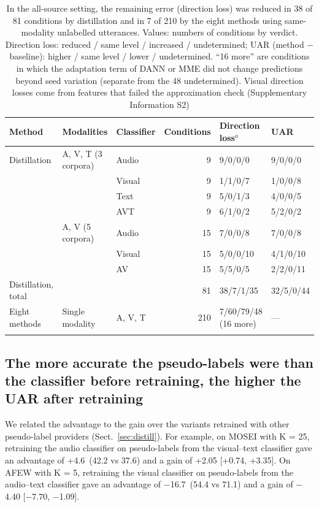 \begin{table}[!htbp]
\caption{In the all-source setting, the remaining error (direction loss) was reduced in 38 of 81 conditions by distillation and in 7 of 210 by the eight methods using same-modality unlabelled utterances. Values: numbers of conditions by verdict. Direction loss: reduced / same level / increased / undetermined; UAR (method $-$ baseline): higher / same level / lower / undetermined. ``16 more'' are conditions in which the adaptation term of DANN or MME did not change predictions beyond seed variation (separate from the 48 undetermined). Visual direction losses come from features that failed the approximation check (Supplementary Information S2)}\label{tab:remaining}
\footnotesize
\begin{tabular}{@{}lllrll@{}}
\toprule
Method & Modalities & Classifier & Conditions & Direction loss$^{a}$ & UAR \\
\midrule
Distillation & A, V, T (3 corpora) & Audio & 9 & 9/0/0/0 & 9/0/0/0 \\
 &  & Visual & 9 & 1/1/0/7 & 1/0/0/8 \\
 &  & Text & 9 & 5/0/1/3 & 4/0/0/5 \\
 &  & AVT & 9 & 6/1/0/2 & 5/2/0/2 \\
 & A, V (5 corpora) & Audio & 15 & 7/0/0/8 & 7/0/0/8 \\
 &  & Visual & 15 & 5/0/0/10 & 4/1/0/10 \\
 &  & AV & 15 & 5/5/0/5 & 2/2/0/11 \\
\midrule
Distillation, total & & & 81 & 38/7/1/35 & 32/5/0/44 \\
Eight methods & Single modality & A, V, T & 210 & 7/60/79/48 (16 more) & --- \\
\botrule
\end{tabular}
\end{table}

\subsection{The more accurate the pseudo-labels were than the classifier before retraining, the higher the UAR after retraining}\label{sec:res-margin}
We related the advantage to the gain over the variants retrained with other pseudo-label providers (Sect.~\ref{sec:distill}). For example, on MOSEI with K = 25, retraining the audio classifier on pseudo-labels from the visual--text classifier gave an advantage of +4.6\pt\ (42.2 vs 37.6) and a gain of +2.05 [+0.74, +3.35]\pt. On AFEW with K = 5, retraining the visual classifier on pseudo-labels from the audio--text classifier gave an advantage of $-$16.7\pt\ (54.4 vs 71.1) and a gain of $-$4.40 [$-$7.70, $-$1.09]\pt.

